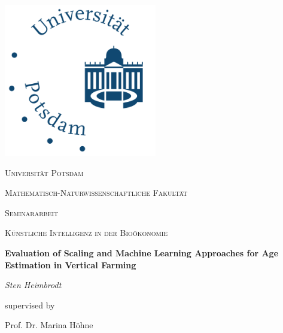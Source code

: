 \documentclass{article}
\begin{document}
\begin{titlepage}
	\centering
	\includegraphics[width=0.5\textwidth]{uplogo.png}\par\vspace{1cm}
	{\scshape\LARGE Universität Potsdam \par}
    {\scshape\LARGE Mathematisch-Naturwissenschaftliche Fakultät \par}
	\vspace{1cm}
    {\scshape\Large Seminararbeit\par}
	{\scshape\Large Künstliche Intelligenz in der Bioökonomie\par}
	\vspace{1.5cm}
	{\huge\bfseries Evaluation of Scaling and Machine Learning Approaches for
Age Estimation in Vertical Farming\par}
	\vspace{2cm}
	{\Large\itshape Sten Heimbrodt\par}
	\vfill
	supervised by\par
	Prof. Dr. Marina Höhne

	\vfill

\end{titlepage}




\printbibliography
\end{document}
